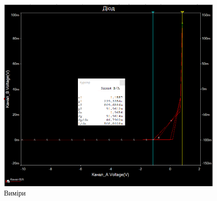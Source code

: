 \documentclass[
  ukrainian,
  14pt
]{extreport}
\begin{document}
\begin{figure}[H]
    \centering
    \includegraphics[width=.6\textwidth]{imgs/D-4.png}
    \caption{Виміри}
\end{figure}
\end{document}
